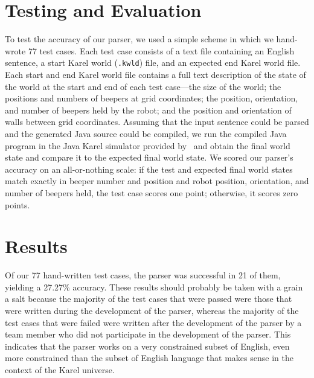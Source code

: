 \documentclass[11pt]{article}
\begin{document}
\section{Testing and Evaluation}
To test the accuracy of our parser, we used a simple scheme in which we hand-wrote 77 test cases.
Each test case consists of a text file containing an English sentence, a start Karel world
(\texttt{.kwld}) file, and an expected end Karel world file. Each start and end Karel world file
contains a full text description of the state of the world at the start and end of each test
case---the size of the world; the positions and numbers of beepers at grid coordinates; the
position, orientation, and number of beepers held by the robot; and the position and orientation of
walls between grid coordinates. Assuming that the input sentence could be parsed and the generated
Java source could be compiled, we run the compiled Java program in the Java Karel simulator
provided by~ and obtain the final world state and compare it to the expected
final world state. We scored our parser's accuracy on an all-or-nothing scale: if the test and
expected final world states match exactly in beeper number and position and robot position,
orientation, and number of beepers held, the test case scores one point; otherwise, it scores zero
points.

\section{Results}
Of our 77 hand-written test cases, the parser was successful in 21 of them, yielding a 27.27\%
accuracy. These results should probably be taken with a grain a salt because the majority of the
test cases that were passed were those that were written during the development of the parser,
whereas the majority of the test cases that were failed were written after the development of the
parser by a team member who did not participate in the development of the parser. This indicates
that the parser works on a very constrained subset of English, even more constrained than the
subset of English language that makes sense in the context of the Karel universe.
\end{document}
